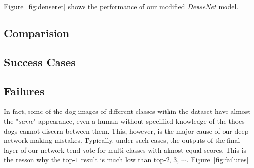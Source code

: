 \documentclass{article}
\begin{document}
Figure~\ref{fig:densenet} shows the performance of our modified \emph{DenseNet} model. 

\subsection{Comparision}

\subsection{Success Cases}
\subsection{Failures}
In fact, some of the dog images of different classes within the dataset have almost the "\emph{same}" appearance, even a human without specifiied knowledge of the thoes dogs cannot discern between them. This, however, is the major cause of our deep network making mistakes. 
Typically, under such cases, the outputs of the final layer of our network tend vote for  multi-classes with almost equal scores. This is the resson why the top-$1$ result is much low than top-$2$, $3$, $\cdots$. 
Figure~\ref{fig:failures}
\end{document}
